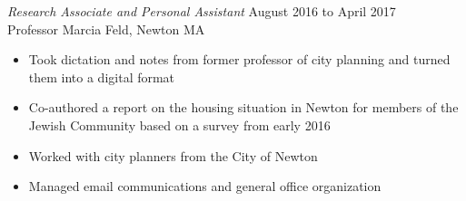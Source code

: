 \documentclass[margin]{res}
\begin{document}
\begin{resume}
  {\sl Research Associate and Personal Assistant} \hfill            August 2016 to April 2017  \\
  Professor Marcia Feld, Newton MA
   	               \begin{itemize}   \itemsep -2pt %
					\item Took dictation and notes from former professor of city planning and turned them into a digital format
					\item Co-authored a report on the housing situation in Newton for members of the Jewish Community based on a survey from early 2016
					\item Worked with city planners from the City of Newton
					\item Managed email communications and general office organization
                   \end{itemize} 

\end{resume}
\end{document}
